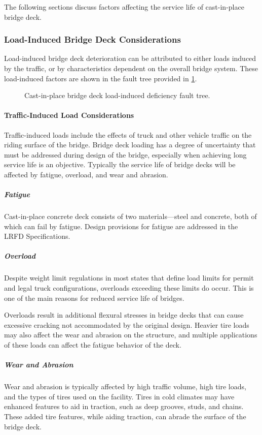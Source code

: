 The following sections discuss factors affecting the service life of cast-in-place bridge deck.

\subsubsection{Load-Induced Bridge Deck Considerations}
Load-induced bridge deck deterioration can be attributed to either loads induced by the traffic, or by characteristics dependent on the overall bridge system. These load-induced factors are shown in the fault tree provided in \cref{fig:fault-tree-cip-bridge-deck}.

\begin{figure}
  \caption{Cast-in-place bridge deck load-induced deficiency fault tree.}
  \label{fig:fault-tree-cip-bridge-deck}
\end{figure}

\paragraph{Traffic-Induced Load Considerations}
Traffic-induced loads include the effects of truck and other vehicle traffic on the riding surface of the bridge. Bridge deck loading has a degree of uncertainty that must be addressed during design of the bridge, especially when achieving long service life is an objective. Typically the service life of bridge decks will be affected by fatigue, overload, and wear and abrasion.

\subparagraph*{Fatigue}
Cast-in-place concrete deck consists of two materials—steel and concrete, both of which can fail by fatigue. Design provisions for fatigue are addressed in the LRFD Specifications.
\subparagraph*{Overload}
Despite weight limit regulations in most states that define load limits for permit and legal truck configurations, overloads exceeding these limits do occur. This is one of the main reasons for reduced service life of bridges.

Overloads result in additional flexural stresses in bridge decks that can cause excessive cracking not accommodated by the original design. Heavier tire loads may also affect the wear and abrasion on the structure, and multiple applications of these loads can affect the fatigue behavior of the deck.
\subparagraph*{Wear and Abrasion}
Wear and abrasion is typically affected by high traffic volume, high tire loads, and the types of tires used on the facility. Tires in cold climates may have enhanced features to aid in traction, such as deep grooves, studs, and chains. These added tire features, while aiding traction, can abrade the surface of the bridge deck.

